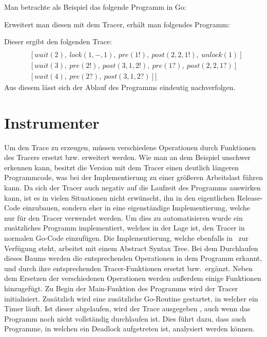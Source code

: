 Man betrachte als Beispiel das folgende Programm in Go:

Erweitert man diesen mit dem Tracer, erhält man folgendes Programm:

Dieser ergibt den folgenden Trace:
\begin{align*}
  [&[signal(2),\ signal(3),\ signal(4),\ pre(3?, default),\ post(default)]\\
  &[wait(2),\ lock(1, -, 1),\ pre(1!),\ post(2, 2, 1!),\ unlock(1)]\\
  &[wait(3),\ pre(2!),\ post(3, 1, 2!),\ pre(1?),\ post(2, 2, 1?)]\\
  &[wait(4),\ pre(2?),\ post(3, 1, 2?)]]
\end{align*}
Aus diesem lässt sich der Ablauf des Programms
eindeutig nachverfolgen.


\section{Instrumenter}
Um den Trace zu erzeugen, müssen verschiedene Operationen durch Funktionen
des Tracers ersetzt bzw. erweitert werden. Wie man an dem Beispiel 
unschwer erkennen kann, besitzt die Version mit dem Tracer einen deutlich längeren
Programmcode, was bei der Implementierung zu einer größeren Arbeitslast 
führen kann. Da sich der Tracer auch negativ auf die Laufzeit des Programms 
auswirken kann, ist es in vielen Situationen nicht erwünscht, ihn in den 
eigentlichen Release-Code einzubauen, sondern eher in eine eigenständige 
Implementierung, welche nur für den Tracer verwendet werden. Um dies zu
automatisieren wurde ein zusätzliches Programm implementiert, welches in der 
Lage ist, den Tracer in normalen Go-Code einzufügen. Die Implementierung, 
welche ebenfalls in~\cite{GoChan} zur Verfügung steht, arbeitet mit einem 
Abstract Syntax Tree. Bei dem Durchlaufen dieses Baums werden die 
entsprechenden Operationen in dem Programm erkannt, und durch ihre entsprechenden 
Tracer-Funktionen ersetzt bzw.\ ergänzt. Neben dem Ersetzen der verschiedenen 
Operationen werden außerdem einige Funktionen hinzugefügt. Zu Begin der 
Main-Funktion des Programms wird der Tracer initialisiert. Zusätzlich
wird eine zusätzliche Go-Routine gestartet, in welcher ein Timer läuft. 
Ist dieser abgelaufen, wird der Trace ausgegeben , 
auch wenn das Programm noch nicht vollständig durchlaufen ist. Dies führt dazu,
dass auch Programme, in welchen ein Deadlock aufgetreten ist, analysiert 
werden können. 
